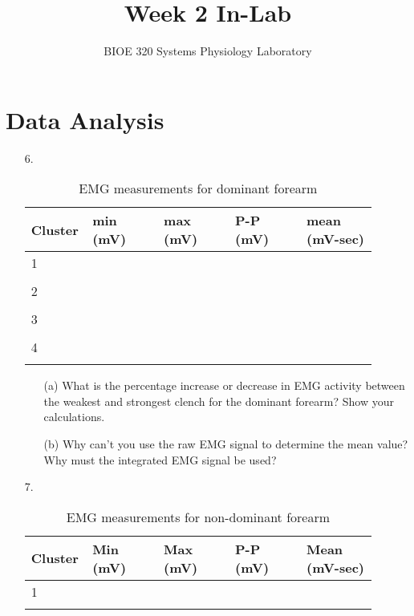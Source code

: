 \documentclass{article}
\title{Week 2 In-Lab}
\author{BIOE 320 Systems Physiology Laboratory}
\date{}
\begin{document}
\large
\maketitle


\section*{Data Analysis}
\begin{itemize}
	\item[6.]
	
	\begin{table}[h!]
	\centering
	\caption{EMG measurements for dominant forearm}
	\begin{tabular}[h!]{p{0.1\linewidth}|p{0.2\linewidth}p{0.2\linewidth}p{0.2\linewidth}p{0.2\linewidth}}
	\toprule
	Cluster & min (mV) & max (mV) & P-P (mV) & mean (mV-sec)\\
	\midrule
	1 & & & &\\& & & &\\
	
	\midrule
	2 & & & &\\& & & &\\
	\midrule
	3 & & & &\\& & & &\\
	\midrule
	4 & & & &\\& & & &\\
	\bottomrule
	\end{tabular}
	\end{table}
	
	\begin{itemize}
		\item[(a)] What is the percentage increase or decrease in EMG activity between the weakest and strongest clench for the dominant forearm? Show your calculations.\vspace{4cm}
		\item[(b)] Why can't you use the raw EMG signal to determine the mean value? Why must the integrated EMG signal be used?\pagebreak
	\end{itemize}
	
	\item[7.]
	\begin{table}[h!]
	\centering
	\caption{EMG measurements for non-dominant forearm}
	\begin{tabular}[h!]{p{0.1\linewidth}|p{0.2\linewidth}p{0.2\linewidth}p{0.2\linewidth}p{0.2\linewidth}}
	\toprule
	Cluster & Min (mV) & Max (mV) & P-P (mV) & Mean (mV-sec)\\
	\midrule
	1 & & & &\\& & & &\\
	

\end{tabular}
\end{table}
\end{itemize}
\end{document}
